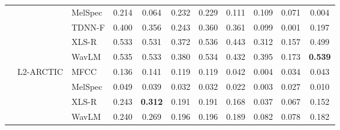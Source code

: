 \begin{table*}[t]
{\begin{tabular}{cllcccc|cccc}
&& MelSpec & 0.214 & 0.064 & 0.232 & 0.229 & 0.111 & 0.109 & 0.071 & 0.004 \\
&& TDNN-F & 0.400 & 0.356 & 0.243 & 0.360 & 0.361 & 0.099 & 0.001 & 0.197 \\
&& XLS-R & 0.533 & 0.531 & 0.372 & 0.536 & 0.443 & 0.312 & 0.157 & 0.499 \\
&& WavLM & 0.535 & 0.533 & 0.380 & 0.534 & 0.432 & 0.395 & 0.173 & \textbf{ 0.539 } \\
\cmidrule{2-11}
&\multirow{4}{*}{L2-ARCTIC}
& MFCC & 0.136 & 0.141 & 0.119 & 0.119 & 0.042 & 0.004 & 0.034 & 0.043 \\
&& MelSpec & 0.049 & 0.039 & 0.032 & 0.032 & 0.022 & 0.003 & 0.027 & 0.010 \\
&& XLS-R & 0.243 & \textbf{ 0.312 } & 0.191 & 0.191 & 0.168 & 0.037 & 0.067 & 0.152 \\
&& WavLM & 0.240 & 0.269 & 0.196 & 0.196 & 0.189 & 0.082 & 0.078 & 0.182 \\
\bottomrule
\end{tabular}%
}
\end{table*}


